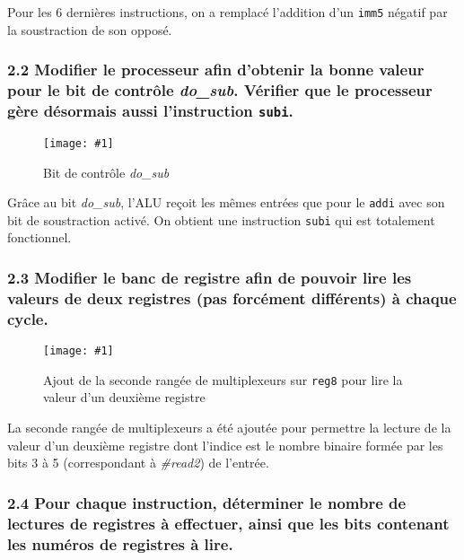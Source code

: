 \documentclass[twoside, 12pt, a4paper]{article}
\newcommand{\cf}[3]{
    \begin{figure}[!h]
        \centering
        \texttt{[image: \#1]}
    \caption{#3}\label{Fig:#1}
    \end{figure}
}
\newcommand{\hcf}[2]{\cf{#1}{.75}{#2}}
\begin{document}
    Pour les 6 dernières instructions, on a remplacé l'addition d'un \texttt{imm5} négatif par la soustraction de son opposé.

        \subsubsection*{\textbf{2.2} Modifier le processeur afin d'obtenir la bonne valeur pour le bit de contrôle \textit{do\_sub}. Vérifier que le processeur gère désormais aussi l'instruction \texttt{subi}.}

    \hcf{do_sub.png}{Bit de contrôle \textit{do\_sub}}
    
    Grâce au bit \textit{do\_sub}, l'ALU reçoit les mêmes entrées que pour le \texttt{addi} avec son bit de soustraction activé.
    On obtient une instruction \texttt{subi} qui est totalement fonctionnel.

\clearpage
        
        \subsubsection*{\textbf{2.3} Modifier le banc de registre afin de pouvoir lire les valeurs de deux registres (pas forcément différents) à chaque cycle.}

    \hcf{mod_reg8.png}{Ajout de la seconde rangée de multiplexeurs sur \texttt{reg8} pour lire la valeur d'un deuxième registre}

    La seconde rangée de multiplexeurs a été ajoutée pour permettre la lecture de la valeur d'un deuxième registre dont l'indice est le nombre binaire formée par les bits 3 à 5 (correspondant à \textit{\#read2}) de l'entrée.

\clearpage

        \subsubsection*{\textbf{2.4} Pour chaque instruction, déterminer le nombre de lectures de registres à effectuer, ainsi que les bits contenant les numéros de registres à lire.}
\end{document}
